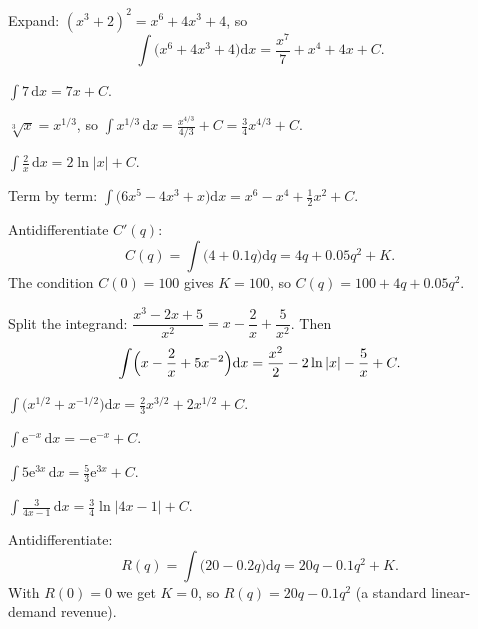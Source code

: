 \begin{solutions}
  \item Expand: $(x^{3}+2)^{2}=x^{6}+4x^{3}+4$, so
        \[
          \int\bigl(x^{6}+4x^{3}+4\bigr)\mathrm{d}x
            =\frac{x^{7}}{7}+x^{4}+4x+C .
        \]

  \item $\displaystyle\int 7\,\mathrm{d}x=7x+C$.

  \item $\sqrt[3]{x}=x^{1/3}$, so
        $\displaystyle\int x^{1/3}\,\mathrm{d}x=\frac{x^{4/3}}{4/3}+C
         =\tfrac{3}{4}x^{4/3}+C$.

  \item $\displaystyle\int \frac{2}{x}\,\mathrm{d}x=2\ln|x|+C$.

  \item Term by term:
        $\displaystyle\int\bigl(6x^{5}-4x^{3}+x\bigr)\mathrm{d}x
         =x^{6}-x^{4}+\tfrac12 x^{2}+C$.

  \item Antidifferentiate $C'(q)$:
        \[
          C(q)=\int\bigl(4+0.1q\bigr)\mathrm{d}q=4q+0.05q^{2}+K .
        \]
        The condition $C(0)=100$ gives $K=100$, so
        $C(q)=100+4q+0.05q^{2}$.

  \item Split the integrand:
        $\dfrac{x^{3}-2x+5}{x^{2}}=x-\dfrac{2}{x}+\dfrac{5}{x^{2}}$. Then
        \[
          \int\Bigl(x-\frac{2}{x}+5x^{-2}\Bigr)\mathrm{d}x
            =\frac{x^{2}}{2}-2\ln|x|-\frac{5}{x}+C .
        \]

  \item $\displaystyle\int\bigl(x^{1/2}+x^{-1/2}\bigr)\mathrm{d}x
        =\tfrac{2}{3}x^{3/2}+2x^{1/2}+C$.

  \item $\displaystyle\int \mathrm{e}^{-x}\,\mathrm{d}x=-\mathrm{e}^{-x}+C$.

  \item $\displaystyle\int 5\mathrm{e}^{3x}\,\mathrm{d}x
        =\tfrac{5}{3}\mathrm{e}^{3x}+C$.

  \item $\displaystyle\int \frac{3}{4x-1}\,\mathrm{d}x
        =\tfrac{3}{4}\ln|4x-1|+C$.

  \item Antidifferentiate:
        \[
          R(q)=\int\bigl(20-0.2q\bigr)\mathrm{d}q=20q-0.1q^{2}+K .
        \]
        With $R(0)=0$ we get $K=0$, so $R(q)=20q-0.1q^{2}$ (a standard
        linear-demand revenue).
\end{solutions}

